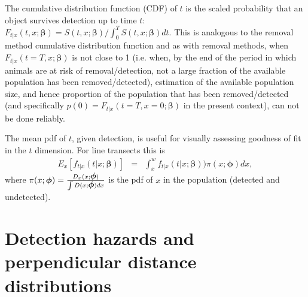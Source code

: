 \documentclass[useAMS,usenatbib,referee]{biom}
\begin{document}
The cumulative distribution function (CDF) of $t$ is the scaled probability that an object survives detection up to time $t$: $F_{t|x}(t,x;\boldsymbol{\beta})=S(t,x;\boldsymbol{\beta})/\int_0^T S(t,x;\boldsymbol{\beta})dt$. This is analogous to the removal method cumulative distribution function and as with removal methods, when $F_{t|x}(t=T,x;\boldsymbol{\beta})$ is not close to 1 (i.e. when, by the end of the period in which animals are at risk of removal/detection, not a large fraction of the available population has been removed/detected), estimation of the available population size, and hence proportion of the population that has been removed/detected (and specifically $p(0)=F_{t|x}(t=T,x=0;\boldsymbol{\beta})$ in the present context), can not be done reliably.

The mean pdf of $t$, given detection, is useful for visually assessing goodness of fit in the $t$ dimension. For line transects this is 
\begin{eqnarray}
E_x[f_{t|x}(t|x;\boldsymbol{\beta})]&=&\int_x^w f_{t|x}(t|x;\boldsymbol{\beta}))\pi(x;\boldsymbol{\phi})dx,
\end{eqnarray}
\noindent
where $\pi(x;\boldsymbol{\phi})=\frac{D_x(x;{\mbox{\boldmath $\phi$}})}{\int D(x
;{\mbox{\boldmath $\phi$}})dx}$ is the pdf of $x$ in the population (detected and undetected). 


\section{Detection hazards and perpendicular distance distributions}
\end{document}
